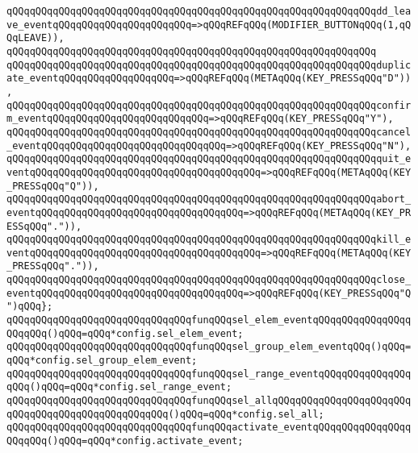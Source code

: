 \verb|qQQqqQQqqQQqqQQqqQQqqQQqqQQqqQQqqQQqqQQqqQQqqQQqqQQqqQQqqQQqqQQqdd_leave_eventqQQqqQQqqQQqqQQqqQQqqQQq=>qQQqREFqQQq(MODIFIER_BUTTONqQQq(1,qQQqLEAVE)),|\newline
\verb|qQQqqQQqqQQqqQQqqQQqqQQqqQQqqQQqqQQqqQQqqQQqqQQqqQQqqQQqqQQqqQQq|\newline
\verb|qQQqqQQqqQQqqQQqqQQqqQQqqQQqqQQqqQQqqQQqqQQqqQQqqQQqqQQqqQQqqQQqduplicate_eventqQQqqQQqqQQqqQQqqQQq=>qQQqREFqQQq(METAqQQq(KEY_PRESSqQQq"D")),|\newline
\verb|qQQqqQQqqQQqqQQqqQQqqQQqqQQqqQQqqQQqqQQqqQQqqQQqqQQqqQQqqQQqqQQqconfirm_eventqQQqqQQqqQQqqQQqqQQqqQQqqQQq=>qQQqREFqQQq(KEY_PRESSqQQq"Y"),|\newline
\verb|qQQqqQQqqQQqqQQqqQQqqQQqqQQqqQQqqQQqqQQqqQQqqQQqqQQqqQQqqQQqqQQqcancel_eventqQQqqQQqqQQqqQQqqQQqqQQqqQQqqQQq=>qQQqREFqQQq(KEY_PRESSqQQq"N"),|\newline
\verb|qQQqqQQqqQQqqQQqqQQqqQQqqQQqqQQqqQQqqQQqqQQqqQQqqQQqqQQqqQQqqQQqquit_eventqQQqqQQqqQQqqQQqqQQqqQQqqQQqqQQqqQQqqQQq=>qQQqREFqQQq(METAqQQq(KEY_PRESSqQQq"Q")),|\newline
\verb|qQQqqQQqqQQqqQQqqQQqqQQqqQQqqQQqqQQqqQQqqQQqqQQqqQQqqQQqqQQqqQQqabort_eventqQQqqQQqqQQqqQQqqQQqqQQqqQQqqQQqqQQq=>qQQqREFqQQq(METAqQQq(KEY_PRESSqQQq".")),|\newline
\verb|qQQqqQQqqQQqqQQqqQQqqQQqqQQqqQQqqQQqqQQqqQQqqQQqqQQqqQQqqQQqqQQqkill_eventqQQqqQQqqQQqqQQqqQQqqQQqqQQqqQQqqQQqqQQq=>qQQqREFqQQq(METAqQQq(KEY_PRESSqQQq".")),|\newline
\verb|qQQqqQQqqQQqqQQqqQQqqQQqqQQqqQQqqQQqqQQqqQQqqQQqqQQqqQQqqQQqqQQqclose_eventqQQqqQQqqQQqqQQqqQQqqQQqqQQqqQQqqQQq=>qQQqREFqQQq(KEY_PRESSqQQq"Q")qQQq};|\newline
\newline
\verb|qQQqqQQqqQQqqQQqqQQqqQQqqQQqqQQqfunqQQqsel_elem_eventqQQqqQQqqQQqqQQqqQQqqQQq()qQQq=qQQq*config.sel_elem_event;|\newline
\verb|qQQqqQQqqQQqqQQqqQQqqQQqqQQqqQQqfunqQQqsel_group_elem_eventqQQq()qQQq=qQQq*config.sel_group_elem_event;|\newline
\verb|qQQqqQQqqQQqqQQqqQQqqQQqqQQqqQQqfunqQQqsel_range_eventqQQqqQQqqQQqqQQqqQQq()qQQq=qQQq*config.sel_range_event;|\newline
\verb|qQQqqQQqqQQqqQQqqQQqqQQqqQQqqQQqfunqQQqsel_allqQQqqQQqqQQqqQQqqQQqqQQqqQQqqQQqqQQqqQQqqQQqqQQqqQQq()qQQq=qQQq*config.sel_all;|\newline
\verb|qQQqqQQqqQQqqQQqqQQqqQQqqQQqqQQqfunqQQqactivate_eventqQQqqQQqqQQqqQQqqQQqqQQq()qQQq=qQQq*config.activate_event;|\newline
